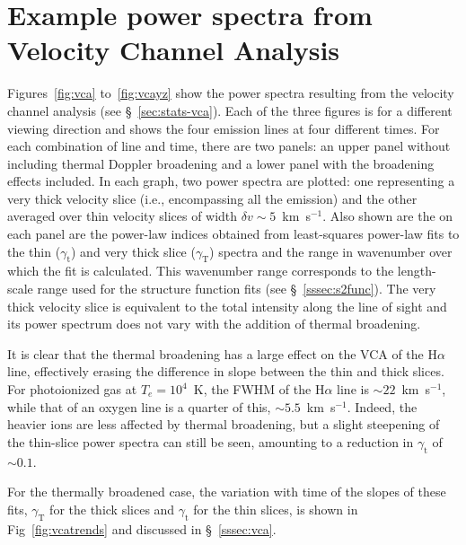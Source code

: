 \documentclass[useAMS,usenatbib]{mn2e}
\newcommand\gammaVCAthin{\ensuremath{\gamma_{\mathrm{t}}}} %
\newcommand\gammaVCAvthick{\ensuremath{\gamma_{\mathrm{T}}}} %
\providecommand{\DIFadd}[1]{{\protect\color{red!70!black}#1}} %
\begin{document}
\section[]{\DIFadd{Example power spectra from Velocity Channel Analysis}}
\label{app:vca}
\DIFadd{Figures~\ref{fig:vca} to~\ref{fig:vcayz} show the power spectra
resulting from the velocity channel analysis (see
\S~\ref{sec:stats-vca}). Each of the three figures is for a different
viewing direction and shows the four emission lines at four different
times. For each combination of line and time, there are two panels: an
upper panel without including thermal Doppler broadening and a lower
panel with the broadening effects included.  In each graph, two power
spectra are plotted: one representing a very thick velocity slice
(i.e., encompassing all the emission) and the other averaged over thin
velocity slices of width $\delta v \sim 5$~km~s$^{-1}$.  Also shown
are the on each panel are the power-law indices obtained from
least-squares power-law fits to the thin (}\gammaVCAthin{}\DIFadd{) and very
thick slice (}\gammaVCAvthick{}\DIFadd{)
spectra and the range in wavenumber over which the fit is
calculated. This wavenumber range corresponds to the length-scale
range used for the structure function fits (see
\S~\ref{sssec:s2func}).  The very thick velocity slice is equivalent
to the total intensity along the line of sight and its power spectrum
does not vary with the addition of thermal broadening.
}

\DIFadd{It is clear that the thermal broadening has a large effect on the VCA
of the H$\alpha$ line, effectively erasing the difference in slope
between the thin and thick slices.  For photoionized gas at $T_e=
10^4$~K, the FWHM of the H$\alpha$ line is $\sim 22$~km~s$^{-1}$,
while that of an oxygen line is a quarter of this, $\sim
5.5$~km~s$^{-1}$.  Indeed, the heavier ions are less affected by
thermal broadening, but a slight steepening of the thin-slice power
spectra can still be seen, amounting to a reduction in }\gammaVCAthin{}
\DIFadd{of \(\sim 0.1\).
}

\DIFadd{For the thermally broadened case, the variation with time of the
slopes of these fits, }\gammaVCAvthick{} \DIFadd{for the thick slices and
}\gammaVCAthin{} \DIFadd{for the thin slices, is shown in
Fig~\ref{fig:vcatrends} and discussed in \S~\ref{sssec:vca}.
}
\end{document}
